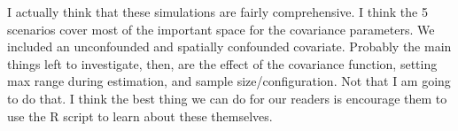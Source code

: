 \documentclass[12pt, titlepage]{article}
\begin{document}
I actually think that these simulations are fairly comprehensive.  I think the 5 scenarios cover most of the important space for the covariance parameters.  We included an unconfounded and spatially confounded covariate.  Probably the main things left to investigate, then, are the effect of the covariance function, setting max range during estimation, and sample size/configuration.  Not that I am going to do that.  I think the best thing we can do for our readers is encourage them to use the R script to learn about these themselves.


%


%
%
\end{document}
